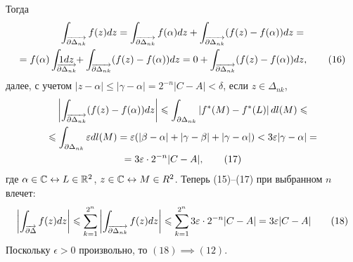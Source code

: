 \documentclass[main]{subfiles}
\begin{document}
\begin{longProof}
    Тогда
    \begin{multline*}
        \AnClOrInt[\AnClOrCurve[\partial \Delta_{nk}]] f(z) dz = \AnClOrInt[\AnClOrCurve[\partial \Delta_{nk}]] f(\alpha) dz + \AnClOrInt[\AnClOrCurve[\partial \Delta_{nk}]] (f(z) - f(\alpha)) dz =\\
        = f(\alpha) \AnClOrInt[\mathrlap{\AnClOrCurve[\partial \Delta_{nk}]}] 1 dz + \AnClOrInt[\AnClOrCurve[\partial \Delta_{nk}]] (f(z) - f(\alpha)) dz = 0 + \AnClOrInt[\AnClOrCurve[\partial \Delta_{nk}]] (f(z) - f(\alpha)) dz, \tag{16}
    \end{multline*}
    далее, с учетом $|z - \alpha| \le |\gamma - \alpha| = 2^{-n} |C - A| < \delta$, если $z \in \Delta_{nk}$,
    \begin{multline*}
        \left| \AnClOrInt[\AnClOrCurve[\partial \Delta_{nk}]] (f(z) - f(\alpha)) dz \right| \le \AnClOrInt[\partial \Delta_{nk}] \left| f^*(M) - f^*(L) \right| dl(M) \le \\
        \le \AnClOrInt[\partial \Delta_{nk}] \epsilon dl(M) = \epsilon (|\beta - \alpha| + |\gamma - \beta| + |\gamma - \alpha|) < 3 \epsilon |\gamma - \alpha| = \\
        = 3 \epsilon \cdot 2^{-n}|C - A|, \tag{17}
    \end{multline*}
    где $\alpha \in \mathbb{C} \leftrightarrow L \in \mathbb{R}^2$, $z \in \mathbb{C} \leftrightarrow M \in R^2$.
    Теперь (15)--(17) при выбранном $n$ влечет:
    \[\left| \AnClOrInt[\AnClOrCurve[\partial \Delta]] f(z) dz \right| \le \sum_{k=1}^{2^n} \left| \AnClOrInt[\AnClOrCurve[\partial \Delta_{nk}]] f(z) dz \right| \le \sum_{k=1}^{2^n} 3 \epsilon \cdot 2^{-n}|C - A| = 3 \epsilon |C - A| \tag{18}\]
    Поскольку $\epsilon > 0$ произвольно, то $(18) \implies (12)$.
\end{longProof}
\end{document}
